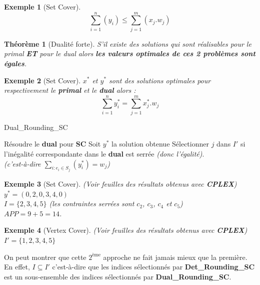\documentclass[12pt]{article}
\newcommand{\titre}[1]{\textcolor{title}{#1}}
\newtheorem{exemple}{Exemple}[section]
\newtheorem{thm}{Th\'eor\`eme}[section]
\begin{document}
\begin{exemple}[Set Cover]
$$\sum_{i=1}^n(y_i) \leq \sum^m_{j=1} (x_j.w_j)$$
\end{exemple}

\begin{thm}[\titre{Dualité forte}] S'il existe des solutions qui sont
réalisables pour le primal \textbf{ET} pour le dual alors \textbf{les valeurs
optimales de ces 2 problèmes sont égales}.
\end{thm}

\begin{exemple}[Set Cover]
$x^*$ et $y^*$ sont des solutions optimales pour respectivement le
\textbf{primal} et le \textbf{dual} alors :
$$ \sum_{i=1}^n y^*_i = \sum_{j=1}^m x^*_j.w_j$$
\end{exemple}

\begin{algorithm}[h!]
\caption{Dual\_Rounding\_SC}
\begin{algorithmic}[1]
\STATE Résoudre le \textbf{dual} pour \textbf{\titre{SC}}
\STATE Soit $y^*$ la solution obtenue
\STATE Sélectionner $j$ dans $I'$ si l'inégalité correspondante dans le
\textbf{dual} est serrée \textit{(donc l'égalité)}.\\
\textit{(c'est-à-dire $\sum_{i : e_i \in S_j} (y^*_i) = w_j$)}
\end{algorithmic}
\end{algorithm}

\begin{exemple}[Set Cover] (Voir feuilles des résultats obtenus avec
\textbf{CPLEX}) \\
$y^* = (0,2,0,3,4,0)$ \\
$I = \{2,3,4,5\}$ (les contraintes serrées sont $c_2$, $c_3$, $c_4$ et $c_5$)\\
$APP=9+5=14$.
\end{exemple}

\begin{exemple}[Vertex Cover] (Voir feuilles des résultats obtenus avec
\textbf{CPLEX}) \\
$I' = \{1,2,3,4,5\}$
\end{exemple}

On peut montrer que cette $2^{\text{ème}}$ approche ne fait jamais mieux que la
première. En effet, $I \subseteq I'$ c'est-à-dire que les indices sélectionnés
par \textbf{Det\_Rounding\_SC} est un sous-ensemble des indices sélectionnés par
\textbf{Dual\_Rounding\_SC}.
\end{document}
